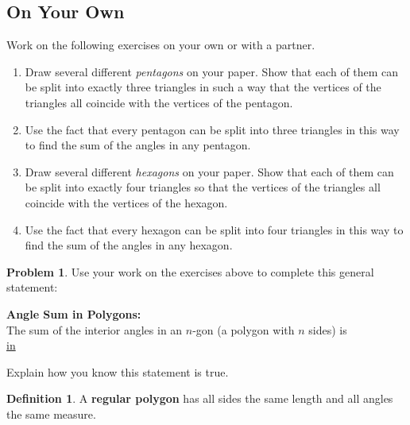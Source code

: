 \documentclass[12pt, reqno]{amsart}
\theoremstyle{remark}
\theoremstyle{definition}
\newtheorem{define}[thm]{Definition}
\newtheorem{problem}{Problem}
\numberwithin{equation}{section}  %
\begin{document}
\bigskip

\subsection*{On Your Own}
Work on the following exercises on your own or with a partner.
\begin{enumerate}
\item
Draw several different \emph{pentagons} on your paper.  Show that each of them can be split into exactly three triangles in such a way that the vertices of the triangles all coincide with the vertices of the pentagon.\\

\item
Use the fact that every pentagon can be split into three triangles in this way to find the sum of the angles in any pentagon.\\

\item
Draw several different \emph{hexagons} on your paper.  Show that each of them can be split into exactly four triangles so that the vertices of the triangles all coincide with the vertices of the hexagon.\\

\item
Use the fact that every hexagon can be split into four triangles in this way to find the sum of the angles in any hexagon.\\

\end{enumerate}

\bigskip
\bigskip

\newpage

\begin{problem}
Use your work on the exercises above to complete this general statement:
\begin{center}
{\bf Angle Sum in Polygons:}\\
The sum of the interior angles in an $n$-gon (a polygon with $n$ sides) is \\
\bigskip
\underline{ in }
\end{center}
Explain how you know this statement is true.
\end{problem}


\bigskip
\bigskip


\begin{define}
A {\bf regular polygon} has all sides the same length and all angles the same measure.  
\end{define}
\end{document}
